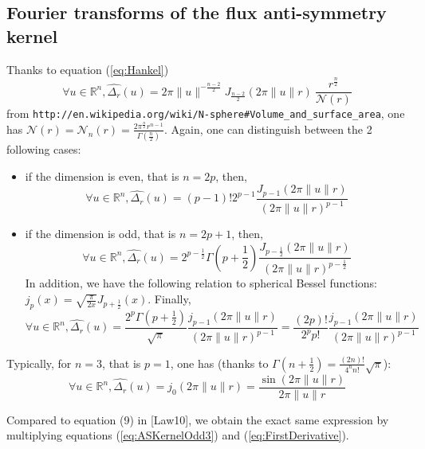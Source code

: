 \documentclass[11pt]{amsart}
\begin{document}
\subsection{Fourier transforms of the flux anti-symmetry kernel}
Thanks to equation (\ref{eq:Hankel})
\begin{equation}\label{eq:ASKernel0}
\forall u\in\mathbb{R}^n,  \widehat{\Delta_r} (u) =  2\pi \|u\|^{-\frac{n-2}{2}} J_{\frac{n-2}{2}}(2\pi \|u\| r) ~\frac{r^{\frac{n}{2}}  }{\mathcal{N}(r)}
\end{equation}
from \texttt{http://en.wikipedia.org/wiki/N-sphere\#Volume\_and\_surface\_area}, one has $\mathcal{N}(r) = \mathcal{N}_n(r) = \frac{2 \pi^\frac{n}{2} r^{n-1}}{\Gamma(\frac{n}{2})}$. Again, one can distinguish between the 2 following cases:
\begin{itemize}
\item if the dimension is even, that is $n = 2p$, then,
\begin{equation}\label{eq:ASKernelEven}
\forall u\in\mathbb{R}^n,  \widehat{\Delta_r} (u) =  (p-1)! 2^{p-1} \frac{J_{p-1}(2\pi \|u\| r)}{(2\pi \|u\| r)^{p-1}}
\end{equation}
\item if the dimension is odd, that is $n = 2p+1$, then,
\begin{equation}\label{eq:ASKernelOdd1}
\forall u\in\mathbb{R}^n,  \widehat{\Delta_r} (u) =  2^{p-\frac{1}{2}}\Gamma\left(p + \frac{1}{2}\right) \frac{J_{p-\frac{1}{2}}(2\pi \|u\| r)}{(2\pi \|u\| r)^{p-\frac{1}{2}}}
\end{equation}
In addition, we have the following relation to spherical Bessel functions: $j_p(x) = \sqrt{\frac{\pi}{2 x}}J_{p+\frac{1}{2}}(x)$. Finally, 
\begin{equation}\label{eq:ASKernelOdd2}
\forall u\in\mathbb{R}^n,  \widehat{\Delta_r} (u) = \frac{2^{p}\Gamma\left(p + \frac{1}{2}\right)}{\sqrt{\pi}} \frac{j_{p-1}(2\pi \|u\| r)}{(2\pi \|u\| r)^{p-1} } = \frac{(2p)!}{2^p p!} \frac{j_{p-1}(2\pi \|u\| r)}{(2\pi \|u\| r)^{p-1} }
\end{equation}
\end{itemize}
Typically, for $n=3$, that is $p=1$, one has (thanks to $\Gamma(n+\frac{1}{2}) = \frac{(2n)!}{4^n n!}\sqrt{\pi}$):
\begin{equation}\label{eq:ASKernelOdd3}
\forall u\in\mathbb{R}^n,  \widehat{\Delta_r} (u) =  j_{0}(2\pi \|u\| r) =  \frac{\sin(2\pi \|u\| r)}{2\pi \|u\| r}
\end{equation}

Compared to equation (9) in [Law10], we obtain the exact same expression by multiplying equations (\ref{eq:ASKernelOdd3}) and (\ref{eq:FirstDerivative}).
\end{document}
